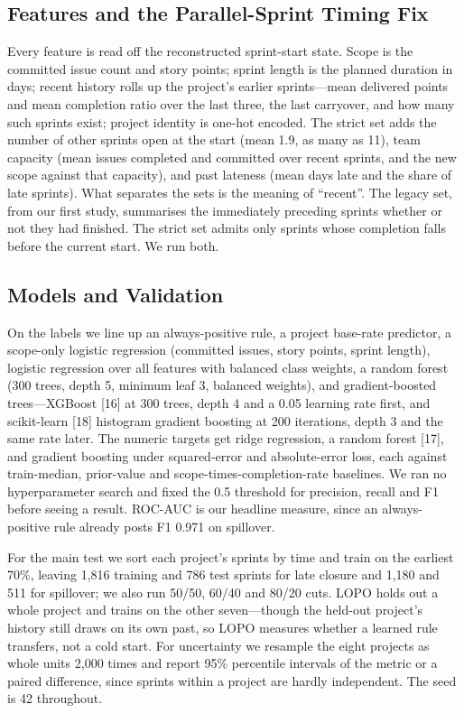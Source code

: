 \documentclass[conference]{IEEEtran}
\begin{document}
\subsection{Features and the Parallel-Sprint Timing Fix}

Every feature is read off the reconstructed sprint-start state. Scope is the committed issue count and story points; sprint length is the planned duration in days; recent history rolls up the project's earlier sprints---mean delivered points and mean completion ratio over the last three, the last carryover, and how many such sprints exist; project identity is one-hot encoded. The strict set adds the number of other sprints open at the start (mean 1.9, as many as 11), team capacity (mean issues completed and committed over recent sprints, and the new scope against that capacity), and past lateness (mean days late and the share of late sprints). What separates the sets is the meaning of ``recent''. The legacy set, from our first study, summarises the immediately preceding sprints whether or not they had finished. The strict set admits only sprints whose completion falls before the current start. We run both.

\subsection{Models and Validation}

On the labels we line up an always-positive rule, a project base-rate predictor, a scope-only logistic regression (committed issues, story points, sprint length), logistic regression over all features with balanced class weights, a random forest (300 trees, depth 5, minimum leaf 3, balanced weights), and gradient-boosted trees---XGBoost [16] at 300 trees, depth 4 and a 0.05 learning rate first, and scikit-learn [18] histogram gradient boosting at 200 iterations, depth 3 and the same rate later. The numeric targets get ridge regression, a random forest [17], and gradient boosting under squared-error and absolute-error loss, each against train-median, prior-value and scope-times-completion-rate baselines. We ran no hyperparameter search and fixed the 0.5 threshold for precision, recall and F1 before seeing a result. ROC-AUC is our headline measure, since an always-positive rule already posts F1 0.971 on spillover.

For the main test we sort each project's sprints by time and train on the earliest 70\%, leaving 1,816 training and 786 test sprints for late closure and 1,180 and 511 for spillover; we also run 50/50, 60/40 and 80/20 cuts. LOPO holds out a whole project and trains on the other seven---though the held-out project's history still draws on its own past, so LOPO measures whether a learned rule transfers, not a cold start. For uncertainty we resample the eight projects as whole units 2,000 times and report 95\% percentile intervals of the metric or a paired difference, since sprints within a project are hardly independent. The seed is 42 throughout.
\end{document}
